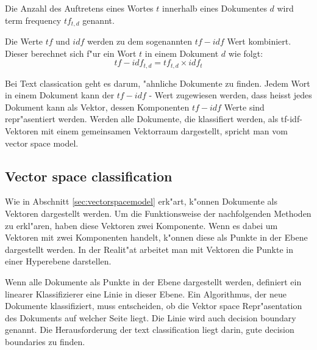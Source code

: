 \documentclass[12pt,a4paper,twoside]{article}
\begin{document}
Die Anzahl des Auftretens eines Wortes $t$ innerhalb eines Dokumentes $d$ wird term frequency $tf_{t,d}$ genannt.

Die Werte $tf$ und $idf$ werden zu dem sogenannten $tf-idf$ Wert kombiniert. Dieser berechnet sich f"ur ein Wort $t$ in einem Dokument $d$ wie folgt:
\[
tf-idf_{t,d} = tf_{t,d} \times idf_t
\]



Bei Text classication geht es darum, "ahnliche Dokumente zu finden. Jedem Wort in einem Dokument kann der $tf-idf$ - Wert zugewiesen werden, dass heisst jedes Dokument kann als Vektor, dessen Komponenten $tf-idf$ Werte sind repr"asentiert werden. Werden alle Dokumente, die klassifiert werden, als tf-idf-Vektoren mit einem gemeinsamen Vektorraum dargestellt, spricht man vom vector space model.

\subsection{Vector space classification}
\label{sec:vectorclassification}

Wie in Abschnitt \ref{sec:vectorspacemodel} erk"art, k"onnen Dokumente als Vektoren dargestellt werden. Um die Funktionsweise der nachfolgenden Methoden zu erkl"aren, haben diese Vektoren zwei Komponente. Wenn es dabei um Vektoren mit zwei Komponenten handelt, k"onnen diese als Punkte in der Ebene dargestellt werden. In der Realit"at arbeitet man mit Vektoren die Punkte in einer Hyperebene darstellen.

Wenn alle Dokumente als Punkte in der Ebene dargestellt werden, de\-finiert ein linearer Klassifizierer eine Linie in dieser Ebene. Ein Algorithmus, der neue Dokumente klassifiziert, muss entscheiden, ob die Vektor space Repr"a\-sentation des Dokuments auf welcher Seite liegt. Die Linie wird auch decision boundary genannt. Die Herausforderung der text classification liegt darin, gute decision boundaries zu finden.
\end{document}

